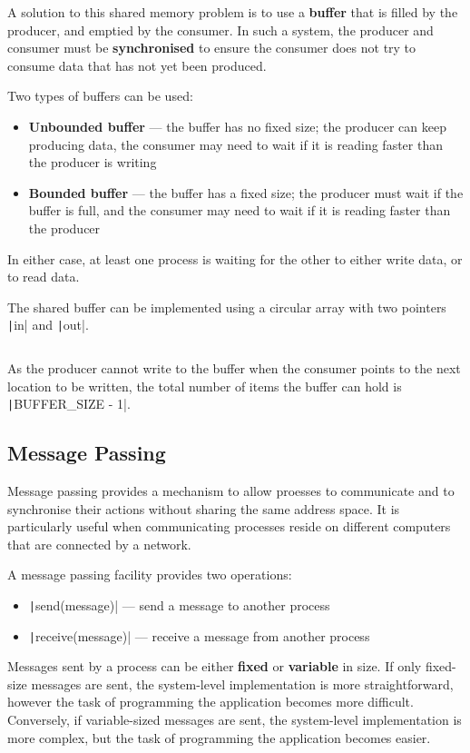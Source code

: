 \documentclass{article}
\begin{document}
A solution to this shared memory problem is to use a \textbf{buffer}
that is filled by the producer, and emptied by the consumer. In such a
system, the producer and consumer must be \textbf{synchronised} to
ensure the consumer does not try to consume data that has not yet been
produced.

Two types of buffers can be used:
\begin{itemize}
    \item \textbf{Unbounded buffer} --- the buffer has no fixed size;
          the producer can keep producing data, the consumer may need
          to wait if it is reading faster than the producer is writing
    \item \textbf{Bounded buffer} --- the buffer has a fixed size; the
          producer must wait if the buffer is full, and the consumer
          may need to wait if it is reading faster than the producer
\end{itemize}
In either case, at least one process is waiting for the other to either
write data, or to read data.

The shared buffer can be implemented using a circular array with two
pointers \texttt|in| and \texttt|out|.
\inputminted{c}{code/shared_memory.c} As the producer cannot write to
the buffer when the consumer points to the next location to be written,
the total number of items the buffer can hold is
\texttt|BUFFER_SIZE - 1|.
\subsection{Message Passing}
Message passing provides a mechanism to allow proesses to communicate
and to synchronise their actions without sharing the same address
space. It is particularly useful when communicating processes reside on
different computers that are connected by a network.

A message passing facility provides two operations:
\begin{itemize}
    \item \texttt|send(message)| --- send a message to another
          process
    \item \texttt|receive(message)| --- receive a message from
          another process
\end{itemize}
Messages sent by a process can be either \textbf{fixed} or
\textbf{variable} in size. If only fixed-size messages are sent, the
system-level implementation is more straightforward, however the task
of programming the application becomes more difficult. Conversely, if
variable-sized messages are sent, the system-level implementation is
more complex, but the task of programming the application becomes
easier.
\end{document}
